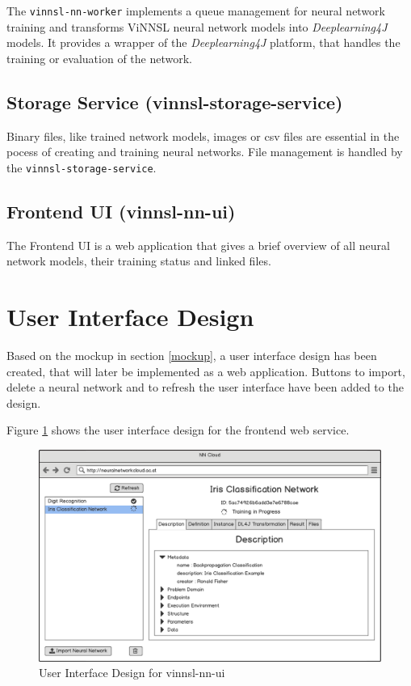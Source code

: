 The \texttt{vinnsl-nn-worker} implements a queue management for neural
network training and transforms ViNNSL neural network models into
\emph{Deeplearning4J} models. It provides a wrapper of the
\emph{Deeplearning4J} platform, that handles the training or evaluation
of the network.

\subsection{Storage Service
(vinnsl-storage-service)}\label{storage-service-vinnsl-storage-service}

Binary files, like trained network models, images or csv files are
essential in the pocess of creating and training neural networks. File
management is handled by the \texttt{vinnsl-storage-service}.

\subsection{Frontend UI (vinnsl-nn-ui)}\label{frontend-ui-vinnsl-nn-ui}

The Frontend UI is a web application that gives a brief overview of all
neural network models, their training status and linked files.

\section{User Interface Design}\label{user-interface-design}

Based on the mockup in section \ref{mockup}, a user interface design has
been created, that will later be implemented as a web application.
Buttons to import, delete a neural network and to refresh the user
interface have been added to the design.

Figure \ref{vinnsl-ui-design} shows the user interface design for the
frontend web service.

\begin{figure}
\centering
\includegraphics[width=17.00000cm]{images/vinnsl-ui-design}
\caption{User Interface Design for vinnsl-nn-ui
\label{vinnsl-ui-design}}
\end{figure}

